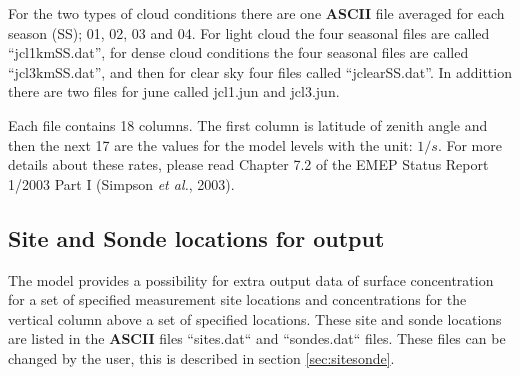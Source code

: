 For the two types of cloud conditions there are one {\bf ASCII} file 
averaged for each season (SS); 01, 02, 03 and 04. 
For light cloud the four seasonal files are called ``jcl1kmSS.dat'', for dense cloud conditions
the four seasonal files are called ``jcl3kmSS.dat'', and then for clear sky four files 
called ``jclearSS.dat''. In addittion there are two files for june called jcl1.jun 
and jcl3.jun.

Each file contains 18 columns. The first column is latitude of zenith 
angle and then the
next 17 are the values for the model levels with the unit: $1/s$. 
For more details about these rates, please read Chapter 7.2 of the EMEP
Status Report 1/2003 Part I (Simpson {\sl et al.}, 2003).


\subsection{Site and Sonde locations for output}\label{sec:sitessondes_input}
The model provides a possibility for extra output data of surface concentration 
for a set of specified measurement site locations and concentrations for the vertical 
column above a set of specified locations. These site and sonde locations are listed 
in the {\bf ASCII} files ``sites.dat`` and ``sondes.dat`` files. These files can be 
changed by the user, this is described in section \ref{sec:sitesonde}.

